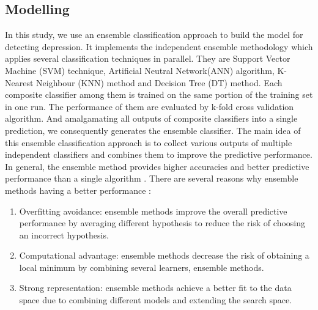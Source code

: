\documentclass[12pt]{article}
\begin{document}
\medskip

\subsection{Modelling}
In this study, we use an ensemble classification approach to build the model for detecting depression. It implements the independent ensemble methodology which applies several classification techniques in parallel. They are Support Vector Machine (SVM) technique, Artificial Neutral Network(ANN) algorithm, K-Nearest Neighbour (KNN) method and Decision Tree (DT) method. Each composite classifier among them is trained on the same portion of the training set in one run. The performance of them are evaluated by k-fold cross validation algorithm. And amalgamating all outputs of composite classifiers into a single prediction, we consequently generates the ensemble classifier. The main idea of this ensemble classification approach is to collect various outputs of multiple independent classifiers and combines them to improve the predictive performance. 
\\

In general, the ensemble method provides higher accuracies and better predictive performance than a single algorithm \cite{Rokach}. There are several reasons why ensemble methods having a better performance \cite{Sagi}: 
\renewcommand\labelitemii{$\square$}
\begin{enumerate}[label=(\roman*)]
  \item Overfitting avoidance: ensemble methods improve the overall predictive performance by averaging different hypothesis to reduce the risk of choosing an incorrect hypothesis.  
  \item \vspace{3mm} Computational advantage: ensemble methods decrease the risk of obtaining a local minimum by combining several learners, ensemble methods.
  \item \vspace{3mm}Strong representation: ensemble methods achieve a better fit to the data space due to combining different models and extending the search space. \\
\end{enumerate}
\end{document}
